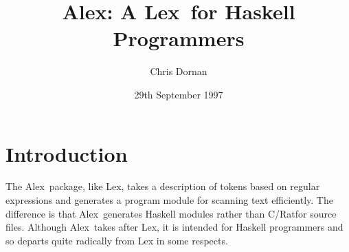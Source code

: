 \setlength\parskip{2ex}
\setlength\parindent{0pt}
\newcommand\shrink[1]{\hbox to 0pt{\parbox[t]{18cm}{#1}\hss}}
\newcommand\display[1]{\hspace{2em}\shrink{#1}}
\newcommand\lx{{Alex}}
\newcommand\lex{Lex}

\title{\lx: A \lex\ for Haskell Programmers}
\author{Chris Dornan}
\date{29th September 1997}
\raggedbottom
\maketitle

\section{Introduction}

The \lx\ package, like \lex, takes a description of tokens based on regular
expressions and generates a program module for scanning text efficiently.  The
difference is that \lx\ generates Haskell modules rather than C/Ratfor source
files.  Although \lx\ takes after \lex, it is intended for Haskell programmers
and so departs quite radically from Lex in some respects.

